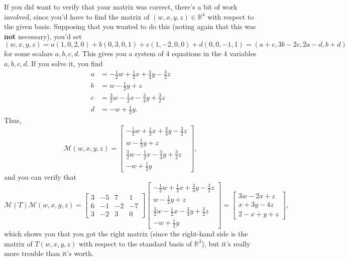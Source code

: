 \documentclass[12pt]{article}
\newcommand{\R}{\mathbb{R}}
\begin{document}
If you did want to verify that your matrix was correct, there's a bit of work involved, since you'd have to find the matrix of $(w,x,y,z)\in\R^4$ with respect to the given basis. Supposing that you wanted to do this (noting again that this was {\bf not} necessary), you'd set
\[
 (w,x,y,z) = a(1,0,2,0)+b(0,3,0,1)+c(1,-2,0,0)+d(0,0,-1,1) = (a+c,3b-2c,2a-d,b+d)
\]
for some scalars $a,b,c,d$. This gives you a system of 4 equations in the 4 variables $a,b,c,d$. If you solve it, you find
\begin{align*}
 a & = -\frac{1}{2}w+\frac{1}{2}x+\frac{3}{4}y-\frac{3}{2}z\\
 b & = w-\frac{1}{2}y+z\\
 c & = \frac{3}{2}w-\frac{1}{2}x-\frac{3}{4}y+\frac{3}{2}z\\
 d & = -w +\frac{1}{2}y.
\end{align*}
Thus, 
\[
\mathcal{M}(w,x,y,z) = \begin{bmatrix}-\frac{1}{2}w+\frac{1}{2}x+\frac{3}{4}y-\frac{3}{2}z\\w-\frac{1}{2}y+z\\\frac{3}{2}w-\frac{1}{2}x-\frac{3}{4}y+\frac{3}{2}z\\-w +\frac{1}{2}y\end{bmatrix},
\]
and you can verify that
\[
 \mathcal{M}(T)\mathcal{M}(w,x,y,z) = \begin{bmatrix}3&-5&7&1\\6&-1&-2&-7\\3&-2&3&0\end{bmatrix}\begin{bmatrix}-\frac{1}{2}w+\frac{1}{2}x+\frac{3}{4}y-\frac{3}{2}z\\w-\frac{1}{2}y+z\\\frac{3}{2}w-\frac{1}{2}x-\frac{3}{4}y+\frac{3}{2}z\\-w +\frac{1}{2}y\end{bmatrix} = \begin{bmatrix}3w-2x+z\\x+3y-4z\\2-x+y+z\end{bmatrix},
\]
which shows you that you got the right matrix (since the right-hand side is the matrix of $T(w,x,y,z)$ with respect to the standard basis of $\R^3$), but it's really more trouble than it's worth.
\end{document}
